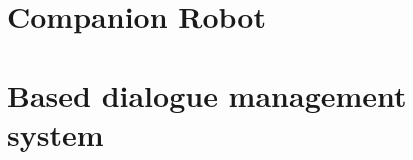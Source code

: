 \documentclass{thesisreport}
\begin{document}
 
 \section{Companion Robot}  \label{companionRobot}
 
 \section{Based dialogue management system} \label{speech}

  
 
 
 
 
 
 
 
 
 
 
 
 
 
 

 
 
 
 
 
 
 
\end{document}
